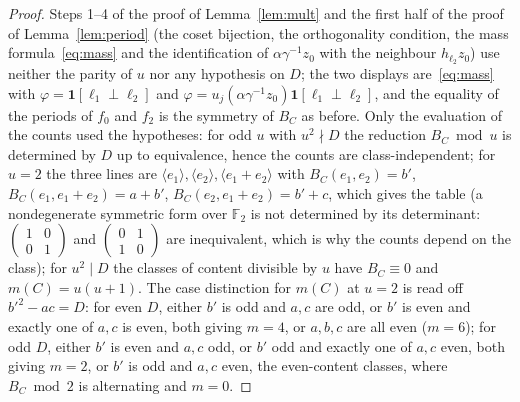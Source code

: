 \documentclass[11pt,a4paper]{article}
\theoremstyle{remark}\newtheorem{remark}[theorem]{Remark}
\begin{document}
\begin{proof}
Steps 1--4 of the proof of Lemma~\ref{lem:mult} and the first half of the proof of Lemma~\ref{lem:period} (the coset bijection,
the orthogonality condition, the mass formula~\eqref{eq:mass} and the identification of $\alpha\gamma^{-1}z_0$ with the
neighbour $h_{\ell_2}z_0$) use neither the parity of $u$ nor any hypothesis on $D$; the two displays are~\eqref{eq:mass} with
$\varphi=\mathbf 1[\ell_1\perp\ell_2]$ and $\varphi=u_j(\alpha\gamma^{-1}z_0)\mathbf 1[\ell_1\perp\ell_2]$, and the equality of the
periods of $f_0$ and $f_2$ is the symmetry of $B_C$ as before. Only the evaluation of the counts used the hypotheses: for odd $u$
with $u^2\nmid D$ the reduction $B_C\bmod u$ is determined by $D$ up to equivalence, hence the counts are class-independent;
for $u=2$ the three lines are $\langle e_1\rangle,\langle e_2\rangle,\langle e_1+e_2\rangle$ with $B_C(e_1,e_2)=b'$,
$B_C(e_1,e_1+e_2)=a+b'$, $B_C(e_2,e_1+e_2)=b'+c$, which gives the table (a nondegenerate symmetric form over $\mathbb F_2$ is
not determined by its determinant: $\left(\begin{smallmatrix}1&0\\0&1\end{smallmatrix}\right)$ and
$\left(\begin{smallmatrix}0&1\\1&0\end{smallmatrix}\right)$ are inequivalent, which is why the counts depend on the class);
for $u^2\mid D$ the classes of content divisible by $u$ have $B_C\equiv0$ and $m(C)=u(u+1)$. The case distinction for $m(C)$
at $u=2$ is read off $b'^2-ac=D$: for even $D$, either $b'$ is odd and $a,c$ are odd, or $b'$ is even and exactly one of $a,c$ is even,
both giving $m=4$, or $a,b,c$ are all even ($m=6$); for odd $D$, either $b'$ is even and $a,c$ odd, or $b'$ odd and exactly one of $a,c$
even, both giving $m=2$, or $b'$ is odd and $a,c$ even, the even-content classes, where $B_C\bmod2$ is alternating and $m=0$.
\end{proof}
\end{document}
